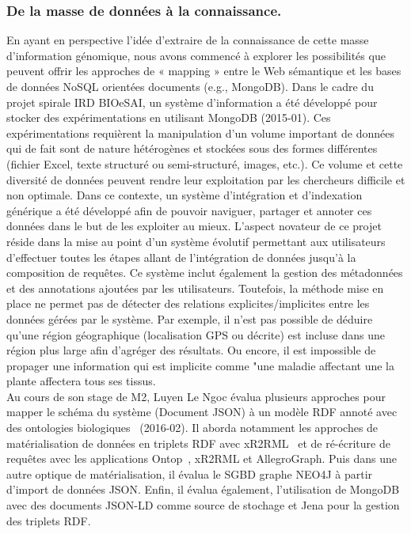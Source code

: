 \subsubsection*{De la masse de données à la connaissance.}
En ayant en perspective l'idée d'extraire de la connaissance de cette masse d’information génomique, nous avons commencé à explorer les possibilités que peuvent offrir les approches de « mapping » entre le Web sémantique et les bases de données NoSQL orientées documents (e.g., MongoDB). Dans le cadre du projet spirale IRD BIOeSAI, un système d’information a été développé pour stocker des expérimentations en utilisant MongoDB (2015-01). Ces expérimentations requièrent la manipulation d’un volume important de données qui de fait sont de nature hétérogènes et stockées sous des formes différentes (fichier Excel, texte structuré ou semi-structuré, images, etc.). Ce volume et cette diversité de données peuvent rendre leur exploitation par les chercheurs difficile et non optimale. Dans ce contexte, un système d’intégration et d'indexation générique a été développé afin de pouvoir naviguer, partager et annoter ces données dans le but de les exploiter au mieux. L'aspect novateur de ce projet réside dans la mise au point d'un système évolutif permettant aux utilisateurs d’effectuer toutes les étapes allant de l’intégration de données jusqu’à la composition de requêtes. Ce système inclut également la gestion des métadonnées et des annotations ajoutées par les utilisateurs. Toutefois, la méthode mise en place ne permet pas de détecter des relations explicites/implicites entre les données gérées par le système.  Par exemple, il n’est pas possible de déduire qu’une région géographique (localisation GPS ou décrite) est incluse dans une région plus large afin d’agréger des résultats. Ou encore, il est impossible de propager une information qui est implicite comme "une maladie affectant une la plante affectera tous ses tissus. \\

Au cours de son stage de M2, Luyen Le Ngoc évalua plusieurs approches pour mapper le schéma du système (Document JSON) à un modèle RDF annoté avec des ontologies biologiques~\cite{Luyen:2016} (2016-02). Il aborda notamment les approches de matérialisation de données en triplets RDF avec xR2RML~\cite{Michel2015} et de ré-écriture de requêtes avec les applications Ontop~\cite{rodriguez2015}, xR2RML et AllegroGraph. Puis dans une autre optique de matérialisation, il évalua le SGBD graphe NEO4J à partir d'import de données JSON. Enfin, il évalua également, l'utilisation de MongoDB avec des documents JSON-LD comme source de stochage et Jena pour la gestion des triplets RDF. \\

